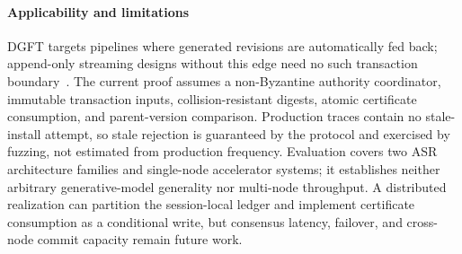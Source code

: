\paragraph{Applicability and limitations}
DGFT targets pipelines where generated revisions are automatically fed back;
append-only streaming designs without this edge need no such transaction
boundary~\cite{mistral2025voxtral,mistral2026voxtralrealtime}. The current
proof assumes a non-Byzantine authority coordinator, immutable transaction
inputs, collision-resistant digests, atomic certificate consumption, and
parent-version comparison. Production traces contain no stale-install attempt,
so stale rejection is guaranteed by the protocol and exercised by fuzzing, not
estimated from production frequency. Evaluation covers two ASR architecture
families and single-node accelerator systems; it establishes neither arbitrary
generative-model generality nor multi-node throughput. A distributed
realization can partition the session-local ledger and implement certificate
consumption as a conditional write, but consensus latency, failover, and
cross-node commit capacity remain future work.
